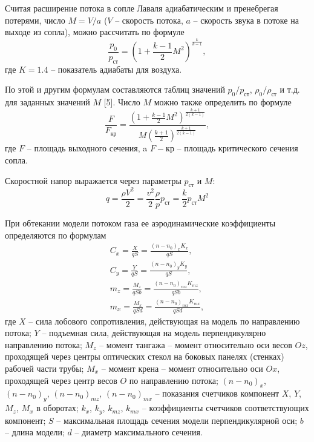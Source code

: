 \documentclass[specialist, subf, href, colorlinks=true, 14pt, final]{disser}
\theoremstyle{definition}
\begin{document}
Считая расширение потока в сопле Лаваля адиабатическим и пренебрегая потерями, число $M = V/a$ ($V$ -- скорость потока, $a$ -- скорость звука в потоке на выходе из сопла), можно рассчитать по формуле
\[ 
  \frac{p_0}{p_{\text{ст}}} = \left( 1 + \frac{k-1}{2}M^2 \right)^{\displaystyle \frac{k}{k-1}},
\]
где $K = 1.4$ -- показатель адиабаты для воздуха.

По этой и другим формулам составляются таблиц значений $p_{0}/p_{\text{ст}}$, $\rho_{0}/\rho_{\text{ст}}$ и т.д. для заданных значений $M$ [5]. Число $M$ можно также определить по формуле
\[
  \frac{F}{F_{\text{кр}}} = \frac{\left( \displaystyle 1 + \frac{k-1}{2} M^2 \right)^{\displaystyle \frac{k+1}{2(k-1)}}}{M\left(\displaystyle  \frac{k+1}{2}\right)^{\displaystyle \frac{k+1}{2(k-1)}} },
\]
где $F$ -- площадь выходного сечения, a $F-{\text{кр}}$ -- площадь критического сечения сопла.

Скоростной напор выражается через параметры $p_{\text{ст}}$ и $M$:
\[
  q = \frac{\rho V^2}{2} = \frac{v^2}{2} \frac{\rho}{p} p_{\text{ст}} = \frac{k}{2} p_{\text{ст}}M^2
\]

При обтекании модели потоком газа ее аэродинамические коэффициенты определяются по формулам
\[
  \begin{array}{l}
    C_x = \displaystyle \frac{X}{q S} =\displaystyle  \frac{(n - n_0)_x K_x}{q S}, \\
    C_y = \displaystyle \frac{Y}{q S} = \displaystyle  \frac{(n - n_0)_y K_y}{q S},\\
    m_z = \displaystyle \frac{M_z}{q S b} = \displaystyle  \frac{(n - n_0)_{mz} K_{mz}}{q S b}, \\
    m_x = \displaystyle \frac{M_x}{q S d} = \displaystyle \frac{(n - n_0)_{mx} K_{mx}}{q S d},
  \end{array} 
\]
где $X$ -- сила лобового сопротивления, действующая на модель по направлению потока; $Y$ -- подъемная сила, действующая на модель перпендикулярно направлению потока; $M_z$ -- момент тангажа -- момент относительно оси весов $Oz$, проходящей через центры оптических стекол на боковых панелях (стенках) рабочей части трубы; $M_x$ -- момент крена -- момент относительно оси $Ox$, проходящей через центр весов $O$ по направлению потока; $(n-n_{0})_{x}$, $(n-n_{0})_{y}$, $(n-n_{0})_{mz}$, $(n-n_{0})_{mx}$ -- показания счетчиков компонент $X$, $Y$, $M_z$, $M_x$ в оборотах; $k_{x}$, $k_{y}$, $k_{mz}$, $k_{mx}$ -- коэффициенты счетчиков соответствующих компонент; $S$ -- максимальная площадь сечения модели перпендикулярной оси; $b$ -- длина модели; $d$ -- диаметр максимального сечения.
\end{document}
